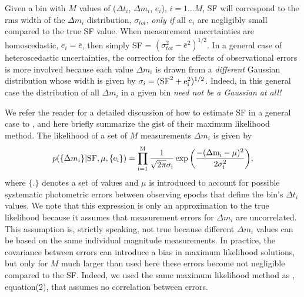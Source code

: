 \documentclass[fleqn,usenatbib]{mnras}
\begin{document}
Given a bin with $M$ values of ($\Delta t_i$, $\Delta m_i$, $e_i$), $i=1...M$, SF will correspond to the rms width
of the $\Delta m_i$ distribution, $\sigma_{tot}$, {\it only if} all $e_i$ are negligibly small compared to the true SF 
value. When measurement uncertainties are homoscedastic, $e_i = \bar{e}$, then simply SF = $(\sigma_{tot}^2
- \bar{e}^2)^{1/2}$. In a general case of heteroscedastic uncertainties, the correction for the effects of 
observational errors is more involved because each value $\Delta m_i$ is drawn from a {\it different}
Gaussian distribution whose width is given by $\sigma_i  = (\rm{SF}^2 + e_i^2)^{1/2}$. Indeed, in this general 
case the distribution of all $\Delta m_i$ in a given bin {\it need not be a Gaussian at all!}

We refer the reader for a detailed discussion of how to estimate SF in a general case to \cite{ivezic2014}, 
and here briefly summarize the gist of their maximum likelihood method. The likelihood of a set of $M$
measurements $\Delta m_i$ is given by 
\begin{equation}
\label{eq:5}
p(\{\Delta m_{i}\} | \rm{SF}, \mu, \{e_{i}\} ) = 
 \prod _{i=1}^{M} { \frac{1}{\sqrt{2\pi} \sigma_i} \exp{\left( \frac{-(\Delta m_{i}-\mu)^{2}}{2\sigma_i^{2}} \right)}},
\end{equation}
where $\{.\}$ denotes a set of values and $\mu$ is introduced to account for possible systematic photometric 
errors between observing epochs that define the bin's $\Delta t_i$ values. We note that this expression is only 
an approximation to the true likelihood because it assumes that measurement errors for $\Delta m_i$ are 
uncorrelated. This assumption is, strictly speaking, not true because different $\Delta m_i$ values can be 
based on the same individual magnitude measurements. In practice, the covariance between errors can introduce a bias in maximum likelihood solutions, but only for $M$ much larger than used here these errors become not negligible compared to the SF. Indeed, we used the same maximum likelihood method as \cite{schmidt2010}, equation(2), that assumes no correlation between errors. 
\end{document}
